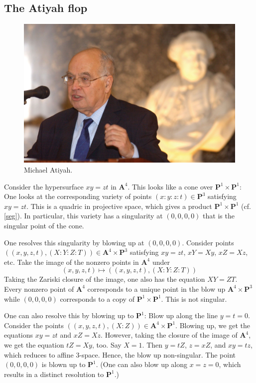 \documentclass[11pt, oneside,margin=1in]{article}
\begin{document}
\subsection{The Atiyah flop}
\begin{figure}
\begin{center}
\includegraphics[scale=0.15]{images/atiyah}
\caption{Michael Atiyah.}
\end{center}
\end{figure}
Consider the hypersurface $xy=zt$ in $\mathbf{A}^4$. This looks like a cone over $\mathbf{P}^1\times \mathbf{P}^1$: One looks at the corresponding variety of points $(x:y:z:t)\in \mathbf{P}^3$ satisfying $xy=zt$. This is a quadric in projective space, which gives a product $\mathbf{P}^1\times \mathbf{P}^1$ (cf. \cref{seg}). In particular, this variety has a singularity at $(0,0,0,0)$ that is the singular point of the cone.

One resolves this singularity by blowing up at $(0,0,0,0)$. Consider points $((x,y,z,t),  (X:Y:Z:T)) \in \mathbf{A}^4\times \mathbf{P}^3$ satisfying $xy=zt$, $xY=Xy$, $xZ = Xz$, etc. Take the image of the nonzero points in $\mathbf{A}^4$ under
\[
	(x,y,z,t)\longmapsto  ((x,y,z,t),  (X:Y:Z:T))
	\]
	Taking the Zariski closure of the image, one also has the equation $XY=ZT$. Every nonzero point of $\mathbf{A}^4$ corresponds to a unique point in the blow up $\mathbf{A}^4\times \mathbf{P}^3$ while $(0,0,0,0)$ corresponds to a copy of $\mathbf{P}^1\times \mathbf{P}^1$. This is not singular.

	One can also resolve this by blowing up to $\mathbf{P}^1$: Blow up along the line $y=t=0$. Consider the points $((x,y,z,t),  (X:Z)) \in \mathbf{A}^4\times \mathbf{P}^1$. Blowing up, we get the equations $xy=zt$ and $xZ=Xz$. However, taking the closure of the image of $\mathbf{A}^4$, we get the equation $tZ = Xy$, too. Say $X=1$. Then $y=tZ$, $z=xZ$, and $xy=tz$, which reduces to affine $3$-space. Hence, the blow up non-singular. The point $(0,0,0,0)$ is blown up to $\mathbf{P}^1$. (One can also blow up along $x=z=0$, which results in a distinct resolution to $\mathbf{P}^1$.)
\end{document}
